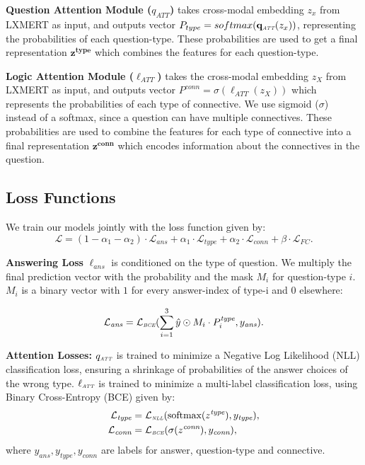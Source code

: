         \textbf{Question Attention Module ($q_{\textit{ATT}}$)}
        takes cross-modal embedding $z_x$ from LXMERT as input, and outputs vector \textbf{$P_{type} = softmax(\mathbf{q_{\textit{\tiny ATT}}}(z_x))$}, representing the probabilities of each question-type. 
        These probabilities are used to get a final representation $\mathbf{z^{type}}$ which combines the features for each question-type.\footnotemark[1]

        \textbf{Logic Attention Module ($\ell_{\textit{ATT}}$)}
        takes the cross-modal embedding $z_X$ from LXMERT as input, and outputs vector \textbf{$P^{conn} = \sigma(\mathbf{\ell_{\textit{ATT}}}(z_X))$} which represents the probabilities of each type of connective.
        We use sigmoid ($\sigma$) instead of a softmax, since a question can have multiple connectives.
        These probabilities are used to combine the features for each type of connective into a final representation $\mathbf{z^{conn}}$ which encodes information about the connectives in the question.

    \subsection{Loss Functions}
    We train our models jointly with the loss function given by:
    \begin{equation}
        \mathcal{L} = (1{-}\alpha_1{-}\alpha_2)\cdot \mathcal{L}_{ans} + \alpha_1 \cdot \mathcal{L}_{type} + \alpha_2 \cdot \mathcal{L}_{conn} + \beta\cdot\mathcal{L}_{\mathit{FC}}.
    \end{equation}

        \noindent\textbf{Answering Loss} $\ell_{ans}$ is conditioned on the type of question.
        We multiply the final prediction vector with the probability and the mask $M_i$ for question-type $i$.
        $M_i$ is a binary vector with $1$ for every answer-index of type-i and $0$ elsewhere:
        
        \begin{equation}
            \mathcal{L}_{\textit{ans}} = \mathcal{L}_{\textit{\tiny BCE}}(\sum_{i=1}^{3}\hat{y} \odot M_i \cdot P^{\textit{type}}_i, y_{\textit{ans}}).
        \end{equation}
        
        \noindent\textbf{Attention Losses:}
        $q_{\textit{\tiny ATT}}$ is trained to minimize a Negative Log Likelihood (NLL) classification loss, ensuring a shrinkage of probabilities of the answer choices of the wrong type. $\ell_{\textit{\tiny ATT}}$ is trained to minimize a multi-label classification loss, using Binary Cross-Entropy (BCE) given by:
        \begin{align}
            \mathcal{L}_{\textit{type}} &= \mathcal{L}_{\textit{\tiny NLL}}(\text{softmax}(z^{\textit{type}}), y_{\textit{type}}),\\
             \mathcal{L}_{\textit{conn}} &= \mathcal{L}_{\textit{\tiny BCE}}(\sigma(z^{\textit{conn}}), y_{\textit{conn}}),
        \end{align}
        where $y_{ans}, y_{type}, y_{conn}$ are labels for answer, question-type and connective.\\

